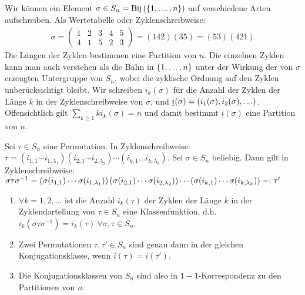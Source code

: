 Wir können ein Element $\sigma \in S_n = \text{Bij}\left( \left\{ 1,\dots,n \right\} \right)$
auf verschiedene Arten aufschreiben. Als Wertetabelle oder Zyklenschreibweise:
\begin{align*}
    \sigma = \begin{pmatrix}
        1 & 2 & 3 & 4 & 5 \\ 4 & 1 & 5 & 2 & 3
    \end{pmatrix}
    = (142)(35)
    = (53)(421)
\end{align*}
Die Längen der Zyklen bestimmen eine Partition von $n$. Die einzelnen Zyklen
kann man auch verstehen als die Bahn in $\left\{ 1,\dots,n \right\}$
unter der Wirkung der von $\sigma$ erzeugten Untergruppe von $S_n$, wobei
die zyklische Ordnung auf den Zyklen unberücksichtigt bleibt. Wir schreiben
$i_k (\sigma)$ für die Anzahl der Zyklen der Länge $k$ in der Zyklenschreibweise
von $\sigma$, und $\underline{i}(\sigma) = \klammer{i_1 (\sigma),i_2(\sigma),\dots}$.
Offensichtlich gilt $\sum_{k \geq 1} k i_k (\sigma) = n$ und damit bestimmt
$\underline{i}(\sigma)$ eine Partition von $n$.

\begin{lemma}
    Sei $\tau \in S_n$ eine Permutation. In Zyklenschreibweise:
    $\tau = (i_{1,1} \dotsb i_{1,\lambda_1}) (i_{2,1} \dotsb i_{2,\lambda_2}) \dotsb (i_{k,1} \dots i_{k,\lambda_k})$.
    Sei $\sigma \in S_n$ beliebig. Dann gilt in Zyklenschreibweise:
    $\sigma \tau \sigma^{-1} = \left( \sigma(i_{1,1}) \dotsb \sigma(i_{1,\lambda_1}) \right)
    \left( \sigma(i_{2,1}) \dotsb \sigma(i_{2,\lambda_2}) \right) \dotsb
    \left( \sigma(i_{k,1}) \dotsb \sigma(i_{k,\lambda_k}) \right) =: \tau'$
\end{lemma}

\begin{korollar}
    \begin{enumerate}[(1)]
        \item $\forall k =1,2,\dots$ ist die Anzahl $i_k (\tau)$ der Zyklen
            der Länge $k$ in der Zyklendartellung von $\tau \in S_n$ eine
            Klassenfunktion, d.h. $i_k(\sigma \tau \sigma^{-1}) = i_k(\tau) \
            \forall \sigma,\tau \in S_n$.
        \item Zwei Permutationen $\tau,\tau' \in S_n$ sind genau dann in der gleichen
            Konjugationsklasse, wenn $\underline{i}(\tau) = \underline{i}(\tau')$.
        \item Die Konjugationsklassen von $S_n$ sind also in $1-1$-Korrespondenz zu
            den Partitionen von $n$.
    \end{enumerate}
\end{korollar}

